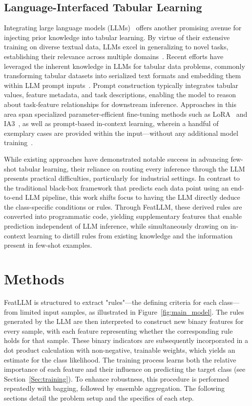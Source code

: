 \subsection{Language-Interfaced Tabular Learning} Integrating large language models (LLMs)~\cite{anil2023palm,openai2023gpt4} offers another promising avenue for injecting prior knowledge into tabular learning. By virtue of their extensive training on diverse textual data, LLMs excel in generalizing to novel tasks, establishing their relevance across multiple domains~\cite{brown2020language}. Recent efforts have leveraged the inherent knowledge in LLMs for tabular data problems, commonly transforming tabular datasets into serialized text formats and embedding them within LLM prompt inputs~\cite{dinh2022lift,hegselmann2023tabllm,wang2023anypredict}. Prompt construction typically integrates tabular values, feature metadata, and task descriptions, enabling the model to reason about task-feature relationships for downstream inference. Approaches in this area span specialized parameter-efficient fine-tuning methods such as LoRA~\cite{hu2021lora} and IA3~\cite{liu2022few}, as well as prompt-based in-context learning, wherein a handful of exemplary cases are provided within the input—without any additional model training~\cite{dinh2022lift,hegselmann2023tabllm,nam2023semi,slack2023tablet}.

While existing approaches have demonstrated notable success in advancing few-shot tabular learning, their reliance on routing every inference through the LLM presents practical difficulties, particularly for industrial settings. In contrast to the traditional black-box framework that predicts each data point using an end-to-end LLM pipeline, this work shifts focus to having the LLM directly deduce the class-specific conditions or rules. Through \textsf{FeatLLM}, these derived rules are converted into programmatic code, yielding supplementary features that enable prediction independent of LLM inference, while simultaneously drawing on in-context learning to distill rules from existing knowledge and the information present in few-shot examples.

\section{Methods}
\textsf{FeatLLM} is structured to extract "rules"—the defining criteria for each class—from limited input samples, as illustrated in Figure~\ref{fig:main_model}. The rules generated by the LLM are then interpreted to construct new binary features for every sample, with each feature representing whether the corresponding rule holds for that sample. These binary indicators are subsequently incorporated in a dot product calculation with non-negative, trainable weights, which yields an estimate for the class likelihood. The training process learns both the relative importance of each feature and their influence on predicting the target class (see Section~\ref{Sec:training}). To enhance robustness, this procedure is performed repeatedly with bagging, followed by ensemble aggregation. The following sections detail the problem setup and the specifics of each step.

